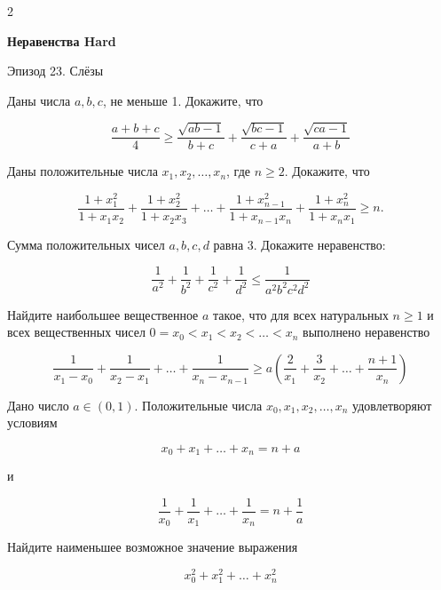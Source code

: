 2\centerline{\bf \Huge Неравенства Hard}

\begin{flushright}
        \scriptsize{Эпизод 23. Слёзы}
\end{flushright}

Даны числа $a, b, c$, не меньше 1. Докажите, что

$$
\frac{a+b+c}{4} \geqslant \frac{\sqrt{a b-1}}{b+c}+\frac{\sqrt{b c-1}}{c+a}+\frac{\sqrt{c a-1}}{a+b}
$$

Даны положительные числа $x_1, x_2, \ldots, x_n$, где $n \geqslant 2$. Докажите, что

$$
\frac{1+x_1^2}{1+x_1 x_2}+\frac{1+x_2^2}{1+x_2 x_3}+\ldots+\frac{1+x_{n-1}^2}{1+x_{n-1} x_n}+\frac{1+x_n^2}{1+x_n x_1} \geqslant n .
$$

Сумма положительных чисел $a, b, c, d$ равна 3. Докажите неравенство:

$$
\frac{1}{a^2}+\frac{1}{b^2}+\frac{1}{c^2}+\frac{1}{d^2} \leqslant \frac{1}{a^2 b^2 c^2 d^2}
$$

Найдите наибольшее вещественное $a$ такое, что для всех натуральных $n \geqslant 1$ и всех вещественных чисел $0=x_0<x_1<x_2<\ldots<x_n$ выполнено неравенство

$$
\frac{1}{x_1-x_0}+\frac{1}{x_2-x_1}+\ldots+\frac{1}{x_n-x_{n-1}} \geqslant a\left(\frac{2}{x_1}+\frac{3}{x_2}+\ldots+\frac{n+1}{x_n}\right)
$$

Дано число $a \in(0,1)$. Положительные числа $x_0, x_1, x_2, \ldots, x_n$ удовлетворяют условиям

$$
x_0+x_1+\ldots+x_n=n+a
$$

и

$$
\frac{1}{x_0}+\frac{1}{x_1}+\ldots+\frac{1}{x_n}=n+\frac{1}{a}
$$


Найдите наименьшее возможное значение выражения

$$
x_0^2+x_1^2+\ldots+x_n^2
$$

